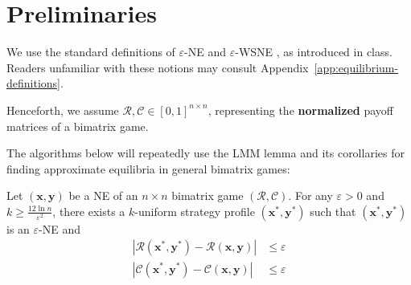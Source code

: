 \section{Preliminaries}

We use the standard definitions of \(\varepsilon\)-NE and \(\varepsilon\)-WSNE \cite[Section~2]{12WSNE}, as introduced in class. Readers unfamiliar with these notions may consult Appendix~\ref{app:equilibrium-definitions}.

Henceforth, we assume \(\mathcal{R},\mathcal{C} \in [0, 1]^{n \times n}\), representing the \textbf{normalized} payoff matrices of a bimatrix game.

The algorithms below will repeatedly use the LMM lemma and its corollaries for finding approximate equilibria in general bimatrix games:

\begin{lemma}
  \label{lem:lmm_thm}
  Let \((\mathbf{x}, \mathbf{y})\) be a NE of an \(n \times n\) bimatrix game \((\mathcal{R}, \mathcal{C})\). For any \(\varepsilon > 0\) and \(k \ge \frac{12 \ln n}{\varepsilon^2}\), there exists a \(k\)-uniform strategy profile \((\mathbf{x}^*, \mathbf{y}^*)\) such that \((\mathbf{x}^*, \mathbf{y}^*)\) is an \(\varepsilon\)-NE and
  \begin{align*}
    |\mathcal{R}(\mathbf{x}^*, \mathbf{y}^*) - \mathcal{R}(\mathbf{x}, \mathbf{y})| & \le \varepsilon \\
    |\mathcal{C}(\mathbf{x}^*, \mathbf{y}^*) - \mathcal{C}(\mathbf{x}, \mathbf{y})| & \le \varepsilon
  \end{align*}
\end{lemma}
